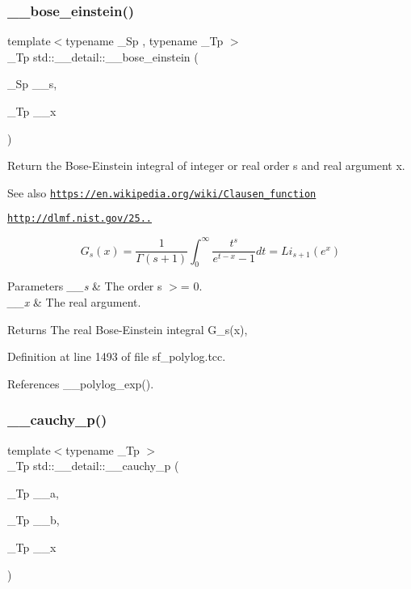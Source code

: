 \subsubsection{\texorpdfstring{\+\_\+\+\_\+bose\+\_\+einstein()}{\_\_bose\_einstein()}}
{\footnotesize\ttfamily template$<$typename \+\_\+\+Sp , typename \+\_\+\+Tp $>$ \\
\+\_\+\+Tp std\+::\+\_\+\+\_\+detail\+::\+\_\+\+\_\+bose\+\_\+einstein (\begin{DoxyParamCaption}\item[{\+\_\+\+Sp}]{\+\_\+\+\_\+s,  }\item[{\+\_\+\+Tp}]{\+\_\+\+\_\+x }\end{DoxyParamCaption})}

Return the Bose-\/\+Einstein integral of integer or real order s and real argument x. \begin{DoxySeeAlso}{See also}
\href{https://en.wikipedia.org/wiki/Clausen_function}{\tt https\+://en.\+wikipedia.\+org/wiki/\+Clausen\+\_\+function} 

\href{http://dlmf.nist.gov/25.12.16}{\tt http\+://dlmf.\+nist.\+gov/25..}
\end{DoxySeeAlso}
\[ G_s(x) = \frac{1}{\Gamma(s+1)}\int_0^\infty \frac{t^s}{e^{t-x} - 1}dt = Li_{s+1}(e^x) \]


\begin{DoxyParams}{Parameters}
{\em \+\_\+\+\_\+s} & The order s $>$= 0. \\
\hline
{\em \+\_\+\+\_\+x} & The real argument. \\
\hline
\end{DoxyParams}
\begin{DoxyReturn}{Returns}
The real Bose-\/\+Einstein integral G\+\_\+s(x), 
\end{DoxyReturn}


Definition at line 1493 of file sf\+\_\+polylog.\+tcc.



References \+\_\+\+\_\+polylog\+\_\+exp().

\mbox{\label{namespacestd_1_1____detail_ac92c91623b3e41c6384c977d5ec594e7}} 
\subsubsection{\texorpdfstring{\+\_\+\+\_\+cauchy\+\_\+p()}{\_\_cauchy\_p()}}
{\footnotesize\ttfamily template$<$typename \+\_\+\+Tp $>$ \\
\+\_\+\+Tp std\+::\+\_\+\+\_\+detail\+::\+\_\+\+\_\+cauchy\+\_\+p (\begin{DoxyParamCaption}\item[{\+\_\+\+Tp}]{\+\_\+\+\_\+a,  }\item[{\+\_\+\+Tp}]{\+\_\+\+\_\+b,  }\item[{\+\_\+\+Tp}]{\+\_\+\+\_\+x }\end{DoxyParamCaption})}



